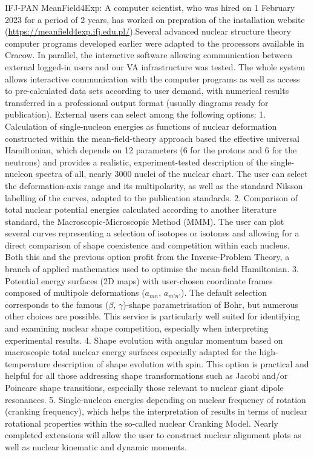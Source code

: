 IFJ-PAN MeanField4Exp: A computer scientist, who was hired on 1 February 2023 for a period of 2 years, has worked on prepration of the installation website (\url{https://meanfield4exp.ifj.edu.pl/}).Several advanced nuclear structure theory computer programs developed earlier were adapted to the processors available in Cracow. In parallel, the interactive software allowing communication between external logged-in users and our VA infrastructure was tested. The whole system allows interactive communication with the computer programs as well as access to pre-calculated data sets according to user demand, with numerical results transferred in a professional output format (usually diagrams ready for publication). External users can select among the following options:
1. Calculation of single-nucleon energies as functions of nuclear deformation constructed within the mean-field-theory approach based the effective universal Hamiltonian, which depends on 12 parameters (6 for the protons and 6 for the neutrons) and provides a realistic, experiment-tested description of the single-nucleon spectra of all, nearly 3000 nuclei of the nuclear chart. The user can select the deformation-axis range and its multipolarity, as well as the standard Nilsson labelling of the curves, adapted to the publication standards.
2. Comparison of total nuclear potential energies calculated according to another literature standard, the Macroscopic-Microscopic Method (MMM). The user can plot several curves representing a selection of isotopes or isotones and allowing for a direct comparison of shape coexistence and competition within each nucleus. Both this and the previous option profit from the Inverse-Problem Theory, a branch of applied mathematics used to optimise the mean-field Hamiltonian.
3. Potential energy surfaces (2D maps) with user-chosen coordinate frames composed of multipole deformations ($a_{mn}$, $a_{m’n’}$). The default selection corresponds to the famous ($\beta$, $\gamma$)-shape parametrisation of Bohr, but numerous other choices are possible. This service is particularly well suited for identifying and examining nuclear shape competition, especially when interpreting experimental results.
4. Shape evolution with angular momentum based on macroscopic total nuclear energy surfaces especially adapted for the high-temperature description of shape evolution with spin. This option is practical and helpful for all those addressing shape transformations such as Jacobi and/or Poincare shape transitions, especially those relevant to nuclear giant dipole resonances.
5. Single-nucleon energies depending on nuclear frequency of rotation (cranking frequency), which helps the interpretation of results in terms of nuclear rotational properties within the so-called nuclear Cranking Model. Nearly completed extensions will allow the user to construct nuclear alignment plots as well as nuclear kinematic and dynamic moments. 
